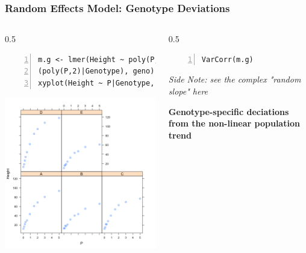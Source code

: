 \documentclass{beamer}
\begin{document}
\begin{frame}[fragile]
    \frametitle{Random Effects Model: Genotype Deviations}
    \begin{columns}
        \begin{column}{0.5\textwidth}
        \scriptsize
            \begin{Verbatim}[numbers=left,numbersep=6pt,frame=single]
m.g <- lmer(Height ~ poly(P,2) + 
(poly(P,2)|Genotype), geno)
xyplot(Height ~ P|Genotype, geno)                
            \end{Verbatim}
            \includegraphics[width=\textwidth]{lectures/day_7_diagnostics_of_mems/figures/unnamed-chunk-21-1.png}
        \end{column}
        \begin{column}{0.5\textwidth}
        \scriptsize
            \begin{Verbatim}[numbers=left,numbersep=6pt,frame=single]
VarCorr(m.g)                
            \end{Verbatim}
            \tiny\scalebox{1}{
                
            }
        \vspace{0.1cm}

        \scriptsize
        \textit{Side Note: see the complex "random slope" here}\\
        \vspace{0.5cm}
        
        \normalsize
        \textbf{Genotype-specific deciations from the non-linear population trend}
        \end{column}
    \end{columns}
\end{frame}
\end{document}
